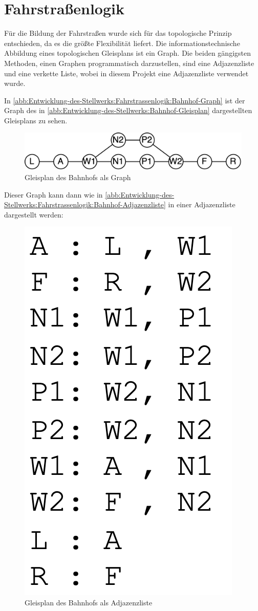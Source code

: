 \section{Fahrstraßenlogik}\label{text:Entwicklung-des-Stellwerks:Fahrstrassenlogik}

Für die Bildung der Fahrstraßen wurde sich für das topologische Prinzip entschieden, da es die größte Flexibilität liefert. Die informationstechnische Abbildung eines topologischen Gleisplans ist ein Graph. Die beiden gängigsten Methoden, einen Graphen programmatisch darzustellen, sind eine Adjazenzliste und eine verkette Liste, wobei in diesem Projekt eine Adjazenzliste verwendet wurde.

In \autoref{abb:Entwicklung-des-Stellwerks:Fahrstrassenlogik:Bahnhof-Graph} ist der Graph des in \autoref{abb:Entwicklung-des-Stellwerks:Bahnhof-Gleisplan} dargestellten Gleisplans zu sehen.

\begin{figure}[H]
    \centering
    \includegraphics[width=\textwidth]{Assets/Images/5-Entwicklung-des-Stellwerks/Bahnhof-Graph.png}
    \caption{Gleisplan des Bahnhofs als Graph}\label{abb:Entwicklung-des-Stellwerks:Fahrstrassenlogik:Bahnhof-Graph}
\end{figure}

Dieser Graph kann dann wie in \autoref{abb:Entwicklung-des-Stellwerks:Fahrstrassenlogik:Bahnhof-Adjazenzliste} in einer Adjazenzliste dargestellt werden:

\begin{figure}[H]
    \centering
    \includegraphics[width=.2\textwidth]{Assets/Images/5-Entwicklung-des-Stellwerks/Bahnhof-Adjazenzliste.png}
    \caption{Gleisplan des Bahnhofs als Adjazenzliste}\label{abb:Entwicklung-des-Stellwerks:Fahrstrassenlogik:Bahnhof-Adjazenzliste}
\end{figure}

